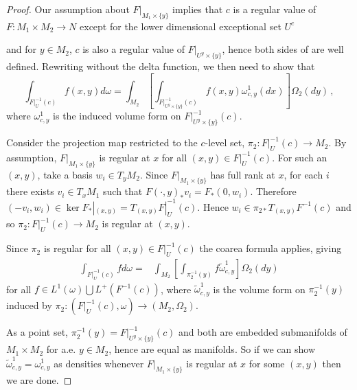 \begin{proof}
Our assumption about $F|_{M_1\times\{y\}}$ implies that $c$ is a regular value of $F:M_1\times M_2\rightarrow N$ except for the lower dimensional exceptional set $U^c$
\begin{comment}
U is a subset of the set given in the condition.  Both are closed
\end{comment}
and for $y\in M_2$, $c$ is also a regular value of $F|_{U^y\times\{y\}}$, hence both sides of  are well defined.  Rewriting  without the delta function, we then need to show that 
\begin{equation}
\int_{F|_U^{-1}(c)} f(x,y) d\omega=\int_{M_2}\left[\int_{F|_{U^y\times\{y\}}^{-1}(c)} f(x,y) \omega^1_{c,y}(dx)\right]\Omega_2(dy)\,,
\end{equation}
where $\omega^1_{c,y}$ is the induced volume form on $F|_{U^y\times\{y\}}^{-1}(c)$.  

Consider the projection map restricted to the $c$-level set, $\pi_2:F|_U^{-1}(c)\rightarrow M_2$.  By assumption, $F|_{M_1\times\{y\}}$ is regular at $x$ for all $(x,y)\in F|_U^{-1}(c)$. For such an $(x,y)$, take a basis $w_i\in T_yM_2$. Since $F|_{M_1\times\{y\}}$ has full rank at $x$, for each $i$ there exists $v_i\in T_xM_1$ such that $F(\cdot,y)_*v_i=F_*(0,w_i)$.  Therefore $(-v_i,w_i)\in \ker F_*|_{(x,y)}=T_{(x,y)}F|_U^{-1}(c)$.  Hence $w_i\in\pi_{2*} T_{(x,y)}F^{-1}(c)$ and so $\pi_2:F|_U^{-1}(c)\rightarrow M_2$ is regular at $(x,y)$.  

Since $\pi_2$ is regular for all $(x,y)\in F|_U^{-1}(c)$ the coarea formula applies, giving
\begin{align}
\int_{F|_U^{-1}(c)}f d\omega=&\int_{M_2}\left[\int_{\pi_2^{-1}(y)}f\tilde{\omega}_{c,y}^1\right]\Omega_2(dy)
\end{align}
for all $f\in L^1(\omega)\bigcup L^+(F^{-1}(c))$, where $\tilde{\omega}_{c,y}^1$ is the volume form on $\pi_2^{-1}(y)$ induced by $\pi_2:(F|_U^{-1}(c),\omega)\rightarrow (M_2,\Omega_2)$.

As a point set, $\pi_2^{-1}(y)=F|_{ U^y\times\{y\}}^{-1}(c)$ and both are embedded submanifolds of $M_1\times M_2$ for a.e. $y\in M_2$, hence are equal as manifolds.  So if we can show $\tilde{\omega}_{c,y}^1=\omega^1_{c,y}$ as densities whenever $F|_{M_1\times\{y\}}$ is regular at $x$ for some $(x,y)$ then we are done.  


\end{proof}

